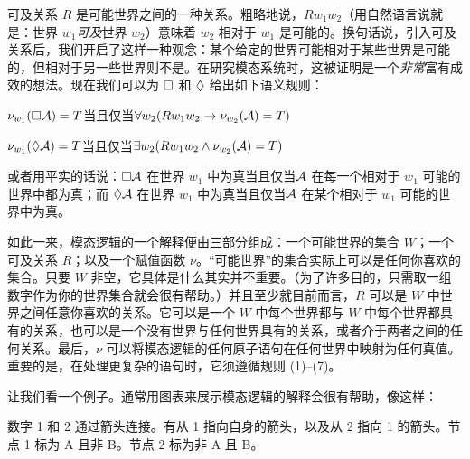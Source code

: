 可及关系 $R$ 是可能世界之间的一种关系。粗略地说，$Rw_1w_2$（用自然语言说就是：世界 $w_1$\emph{可及}世界 $w_2$）意味着 $w_2$ 相对于 $w_1$ 是可能的。换句话说，引入可及关系后，我们开启了这样一种观念：某个给定的世界可能相对于某些世界是可能的，但相对于另一些世界则不是。在研究模态系统时，这被证明是一个\emph{非常}富有成效的想法。现在我们可以为 $\Box$ 和 $\Diamond$ 给出如下语义规则：

\begin{compactlist}[resume]
	\item $\nu_{w_1}(\Box \mathcal{A})=T$当且仅当$\forall w_2 (Rw_1w_2\rightarrow \nu_{w_2}(\mathcal{A})=T)$
	\item $\nu_{w_1}(\Diamond \mathcal{A})=T$当且仅当$\exists w_2 (Rw_1w_2\wedge \nu_{w_2}(\mathcal{A})=T)$
\end{compactlist}

或者用平实的话说：$\Box\mathcal{A}$ 在世界 $w_1$ 中为真当且仅当$\mathcal{A}$ 在每一个相对于 $w_1$ 可能的世界中都为真；而 $\Diamond\mathcal{A}$ 在世界 $w_1$ 中为真当且仅当$\mathcal{A}$ 在某个相对于 $w_1$ 可能的世界中为真。

如此一来，模态逻辑的一个解释便由三部分组成：一个可能世界的集合 $W$；一个可及关系 $R$；以及一个赋值函数 $\nu$。“可能世界”的集合实际上可以是任何你喜欢的集合。只要 $W$ 非空，它具体是什么其实并不重要。（为了许多目的，只需取一组数字作为你的世界集合就会很有帮助。）并且至少就目前而言，$R$ 可以是 $W$ 中世界之间任意你喜欢的关系。它可以是一个 $W$ 中每个世界都与 $W$ 中每个世界都具有的关系，也可以是一个没有世界与任何世界具有的关系，或者介于两者之间的任何关系。最后，$\nu$ 可以将模态逻辑的任何原子语句在任何世界中映射为任何真值。重要的是，在处理更复杂的语句时，它须遵循规则 (1)--(7)。

让我们看一个例子。通常用图表来展示模态逻辑的解释会很有帮助，像这样：

\begin{center}
	\begin{arialabel}{数字 1 和 2 通过箭头连接。有从 1 指向自身的箭头，以及从 2 指向 1 的箭头。节点 1 标为 A 且非 B。节点 2 标为非 A 且 B。}
	\end{arialabel}
\end{center}

